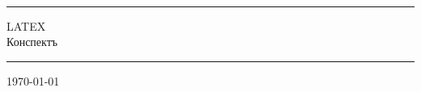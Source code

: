 \label{titlepage}

\begin{titlepage}
    \
    \vspace{10cm}
    \begin{center}
        \hrule
        \medskip
        {\LARGE LATEX}\\
        \bigskip
        Конспектъ
        \medskip
        \hrule

        \vspace{1cm}

        \today \currenttime
    \end{center}
\end{titlepage}

\setcounter{page}{2}

\clearpage